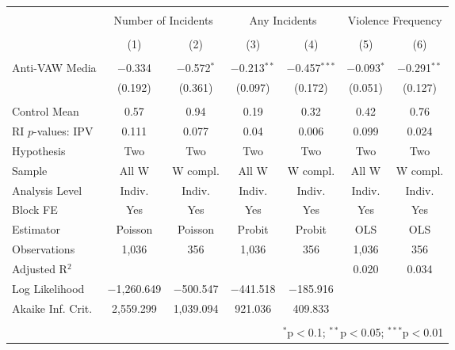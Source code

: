 
\begin{tabular}{@{\extracolsep{5pt}}lcccccc} 
\\[-1.8ex]\hline 
\hline \\[-1.8ex] 
 & \multicolumn{2}{c}{Number of Incidents} & \multicolumn{2}{c}{Any Incidents} & \multicolumn{2}{c}{Violence Frequency} \\ 
\\[-1.8ex] & (1) & (2) & (3) & (4) & (5) & (6)\\ 
\hline \\[-1.8ex] 
 Anti-VAW Media & $-$0.334 & $-$0.572$^{*}$ & $-$0.213$^{**}$ & $-$0.457$^{***}$ & $-$0.093$^{*}$ & $-$0.291$^{**}$ \\ 
  & (0.192) & (0.361) & (0.097) & (0.172) & (0.051) & (0.127) \\ 
 \hline \\[-1.8ex] 
Control Mean & 0.57 & 0.94 & 0.19 & 0.32 & 0.42 & 0.76 \\ 
RI $p$-values: IPV & 0.111 & 0.077 & 0.04 & 0.006 & 0.099 & 0.024 \\ 
Hypothesis & Two & Two & Two & Two & Two & Two \\ 
Sample & All W & W compl. & All W & W compl. & All W & W compl. \\ 
Analysis Level & Indiv. & Indiv. & Indiv. & Indiv. & Indiv. & Indiv. \\ 
Block FE & Yes & Yes & Yes & Yes & Yes & Yes \\ 
Estimator & Poisson & Poisson & Probit & Probit & OLS & OLS \\ 
Observations & 1,036 & 356 & 1,036 & 356 & 1,036 & 356 \\ 
Adjusted R$^{2}$ &  &  &  &  & 0.020 & 0.034 \\ 
Log Likelihood & $-$1,260.649 & $-$500.547 & $-$441.518 & $-$185.916 &  &  \\ 
Akaike Inf. Crit. & 2,559.299 & 1,039.094 & 921.036 & 409.833 &  &  \\ 
\hline 
\hline \\[-1.8ex] 
\multicolumn{7}{r}{$^{*}$p$<$0.1; $^{**}$p$<$0.05; $^{***}$p$<$0.01} \\ 
\end{tabular} 
